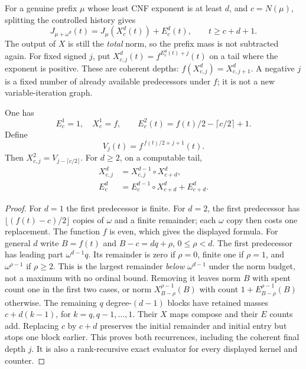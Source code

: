 \documentclass[11pt]{article}
\begin{document}
For a genuine prefix $\mu$ whose least CNF exponent is at least $d$, and
$c=N(\mu)$, splitting the controlled history gives
\begin{equation}\label{eq:prefix}
 J_{\mu+\omega^d}(t)=J_\mu(X^d_c(t))+E^d_c(t),
       \qquad t\ge c+d+1.
\end{equation}
The output of $X$ is still the \emph{total} norm, so the prefix mass is not
subtracted again. For fixed signed $j$, put
$X^d_{c,j}(t)=f^{E^d_c(t)+j}(t)$ on a tail where the exponent is positive.
These are coherent depths: $f(X^d_{c,j})=X^d_{c,j+1}$. A negative $j$ is a
fixed number of already available predecessors under $f$; it is not a new
variable-iteration graph.

\begin{lemma}\label{lem:kernel-recursion}
One has
\[
 E^1_c=1,\quad X^1_c=f,\qquad
 E^2_c(t)=f(t)/2-\lceil c/2\rceil+1.
\]
Define
\begin{equation}\label{eq:V}
 V_j(t)=f^{\,f(t)/2+j+1}(t).
\end{equation}
Then $X^2_{c,j}=V_{j-\lceil c/2\rceil}$. For $d\ge2$, on a computable tail,
\begin{align}
 X^d_{c,j}&=X^{d-1}_{c,j}\circ X^d_{c+d},\label{eq:Xrec}\\
 E^d_c&=E^{d-1}_c\circ X^d_{c+d}+E^d_{c+d}.\label{eq:Erec}
\end{align}
\end{lemma}
\begin{proof}
For $d=1$ the first predecessor is finite. For $d=2$, the first
predecessor has $\lfloor(f(t)-c)/2\rfloor$ copies of $\omega$ and a finite
remainder; each $\omega$ copy then costs one replacement. The function $f$
is even, which gives the displayed formula.
For general $d$ write $B=f(t)$ and $B-c=dq+\rho$, $0\le\rho<d$. The first
predecessor has leading part $\omega^{d-1}q$. Its remainder is zero if
$\rho=0$, finite one if $\rho=1$, and $\omega^{\rho-1}$ if $\rho\ge2$.
This is the largest remainder \emph{below $\omega^{d-1}$} under the norm
budget, not a maximum with no ordinal bound. Removing it leaves norm $B$
with spent count one in the first two cases, or norm
$X^{\rho-1}_{B-\rho}(B)$ with count $1+E^{\rho-1}_{B-\rho}(B)$ otherwise.
The remaining $q$ degree-$(d-1)$ blocks have retained masses
$c+d(k-1)$, for $k=q,q-1,\ldots,1$. Their $X$ maps compose and their $E$
counts add. Replacing $c$ by $c+d$ preserves the initial remainder and
initial entry but stops one block earlier. This proves both recurrences,
including the coherent final depth $j$. It is also a rank-recursive exact
evaluator for every displayed kernel and counter.
\end{proof}
\end{document}
